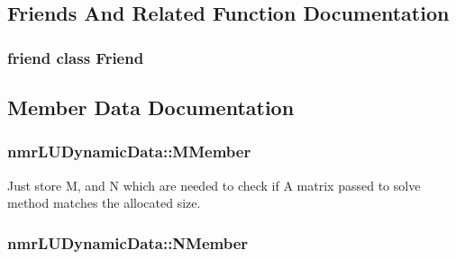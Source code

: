 \subsection{Friends And Related Function Documentation}
\hypertarget{classnmr_l_u_dynamic_data_a7f8321d57e81bc613d5dbef3410ba70e}{}
\subsubsection[{Friend}]{\setlength{\rightskip}{0pt plus 5cm}friend class {\bf Friend}\hspace{0.3cm}{\ttfamily [friend]}}\label{classnmr_l_u_dynamic_data_a7f8321d57e81bc613d5dbef3410ba70e}


\subsection{Member Data Documentation}
\hypertarget{classnmr_l_u_dynamic_data_a859065b13cb287c4e0e67be01f9a779b}{}
\subsubsection[{M\+Member}]{ nmr\+L\+U\+Dynamic\+Data\+::\+M\+Member\hspace{0.3cm}{\ttfamily [protected]}}\label{classnmr_l_u_dynamic_data_a859065b13cb287c4e0e67be01f9a779b}
Just store M, and N which are needed to check if A matrix passed to solve method matches the allocated size. \hypertarget{classnmr_l_u_dynamic_data_a44878cc0e7c2c01ea964a57d447b64bb}{}
\subsubsection[{N\+Member}]{ nmr\+L\+U\+Dynamic\+Data\+::\+N\+Member\hspace{0.3cm}{\ttfamily [protected]}}\label{classnmr_l_u_dynamic_data_a44878cc0e7c2c01ea964a57d447b64bb}
\hypertarget{classnmr_l_u_dynamic_data_acf9e9d0bb436f0e04c6d6138b1cbd8fd}{}

